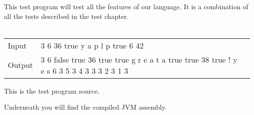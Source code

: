 This test program will test all the features of our language. It is a combination of all the tests described in the test chapter. \\\\
\begin{tabular}{llp{8cm}}
Input 	& 3 6 36 true y a p l p true 6 42 \\
Output 	& 3 6 false true 36 true true g r e a t a true true 38 true ! y e s 6 3 5 3 4 3 3 3 2 3 1 3 \\
\end{tabular}
This is the test program source.
\begin{landscape}

\end{landscape}

Underneath you will find the compiled JVM assembly.
\begin{landscape}

\end{landscape}